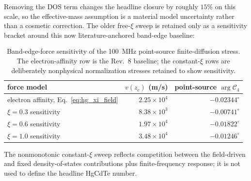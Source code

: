 \documentclass[11pt]{article}
\begin{document}
Removing the DOS term changes the headline closure by roughly $15\%$ on this scale, so the effective-mass assumption is a material model uncertainty rather than a cosmetic correction. The older free-$\xi$ sweep is retained only as a sensitivity bracket around this now literature-anchored band-edge baseline:
\begin{table}[H]
\centering
\caption{Band-edge-force sensitivity of the \SI{100}{MHz} point-source finite-diffusion stress. The electron-affinity row is the Rev.~8 baseline; the constant-$\xi$ rows are deliberately nonphysical normalization stresses retained to show sensitivity.}
\label{tab:hg_xi_sweep}
\begin{tabular}{lrr}
\toprule
force model & $v(z_c)$ (m/s) & point-source $\arg\mathcal C_4$ \\
\midrule
electron affinity, Eq.~\eqref{eq:hg_xi_field} & $2.25\times10^4$ & $-0.02344^\circ$ \\
$\xi=0.3$ sensitivity & $8.38\times10^3$ & $-0.00741^\circ$ \\
$\xi=0.6$ sensitivity & $1.97\times10^4$ & $-0.01822^\circ$ \\
$\xi=1.0$ sensitivity & $3.48\times10^4$ & $-0.01246^\circ$ \\
\bottomrule
\end{tabular}
\end{table}
The nonmonotonic constant-$\xi$ sweep reflects competition between the field-driven and fixed density-of-states contributions plus finite-frequency response; it is not used to define the headline HgCdTe number.
\end{document}

